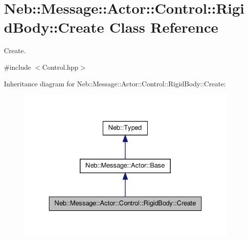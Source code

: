 \hypertarget{classNeb_1_1Message_1_1Actor_1_1Control_1_1RigidBody_1_1Create}{\section{\-Neb\-:\-:\-Message\-:\-:\-Actor\-:\-:\-Control\-:\-:\-Rigid\-Body\-:\-:\-Create \-Class \-Reference}
\label{classNeb_1_1Message_1_1Actor_1_1Control_1_1RigidBody_1_1Create}
}


\-Create.  




{\ttfamily \#include $<$\-Control.\-hpp$>$}



\-Inheritance diagram for \-Neb\-:\-:\-Message\-:\-:\-Actor\-:\-:\-Control\-:\-:\-Rigid\-Body\-:\-:\-Create\-:
\nopagebreak
\begin{figure}[H]
\begin{center}
\leavevmode
\includegraphics[width=312pt]{classNeb_1_1Message_1_1Actor_1_1Control_1_1RigidBody_1_1Create__inherit__graph}
\end{center}
\end{figure}


